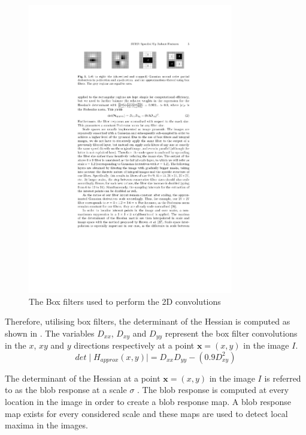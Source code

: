 \documentclass[11pt]{report}
\begin{document}
\begin{figure}[h!] 
  \centering
    \includegraphics[width=0.8\textwidth]{../Drawings/methods/SURF2D_BoxFilters.pdf}
    \caption{The Box filters used to perform the 2D convolutions}
    \label{fig:boxFilters}
\end{figure}

Therefore, utilising box filters, the determinant of the Hessian is computed as shown in . The variables $D_{xx}$, $D_{xy}$ and $D_{yy}$ represent the box filter convolutions in the $x$, $xy$ and $y$ directions respectively at a point $\textbf{x} = (x,y)$ in the image $I$.\\ 

\begin{equation}
det \mid H_{approx} (x,y) \mid = D_{xx}D_{yy} - (0.9 D_{xy}^2)
\label{eqn:approxHessian}
\end{equation}

The determinant of the Hessian at a point $\textbf{x} = (x,y)$ in the image $I$ is referred to as the blob response at a scale $\sigma$ \cite{Bay2008}. The blob response is computed at every location in the image in order to create a blob response map. A blob response map exists for every considered scale and these maps are used to detect local maxima in the images.\\
\end{document}
